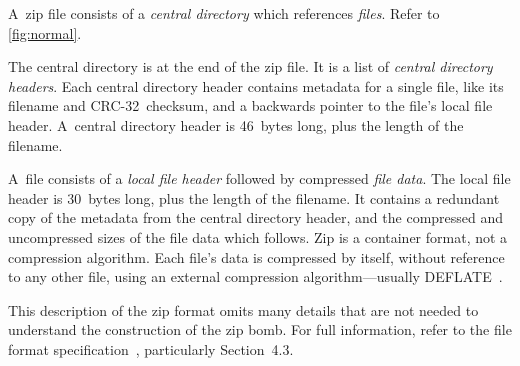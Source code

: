 \documentclass[letterpaper,twocolumn,10pt]{article}
\newcommand{\CRC}{\mbox{CRC-32}}
\begin{document}
A~zip file consists of
a \emph{central directory} which references
\emph{files}.
Refer to \autoref{fig:normal}.

The central directory is at the end of the zip file.
It is a list of \emph{central directory headers}.
Each central directory header contains metadata for a single file,
like its filename and \CRC\ checksum,
and a backwards pointer to the file's local file header.
A~central directory header is \SI{46}{bytes} long,
plus the length of the filename.

A~file consists of a \emph{local file header}
followed by compressed \emph{file data}.
The local file header is \SI{30}{bytes} long,
plus the length of the filename.
It contains a redundant copy
of the metadata from the central directory header,
and the compressed and uncompressed sizes of the file data
which follows.
Zip is a container format, not a compression algorithm.
Each file's data is compressed by itself,
without reference to any other file,
using an external compression algorithm---usually DEFLATE~\cite{rfc1951}.

This description of the zip format omits many details that
are not needed to understand the construction of the zip bomb.
For full information,
refer to the file format specification~\cite{appnote},
particularly Section~4.3.
\end{document}
